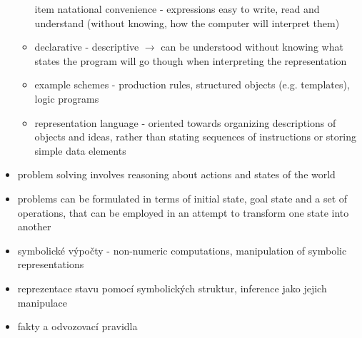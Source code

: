\begin{framed}
\begin{itemize}
\begin{itemize}
          item natational convenience - expressions easy to write, read and
          understand (without knowing, how the computer will interpret them)
        \item declarative - descriptive $\rightarrow$ can be understood without
          knowing what states the program will go though when interpreting the
          representation
        \item example schemes - production rules, structured objects (e.g.
          templates), logic programs
        \item representation language - oriented towards organizing descriptions
          of objects and ideas, rather than stating sequences of instructions or
          storing simple data elements
      \end{itemize}
    \item problem solving involves reasoning about actions and states of the
      world
    \item problems can be formulated in terms of initial state, goal state
      and a set of operations, that can be employed in an attempt to
      transform one state into another
    \item symbolické výpočty - non-numeric computations, manipulation of
      symbolic representations
    \item reprezentace stavu pomocí symbolických struktur, inference jako jejich
      manipulace
    \item fakty a odvozovací pravidla
  \end{itemize}
\end{framed}
